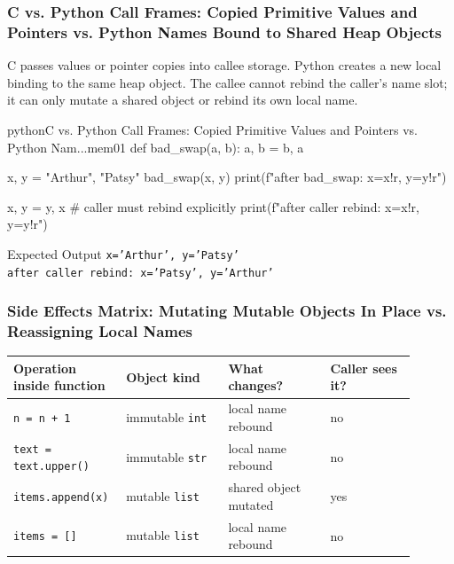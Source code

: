 \documentclass[a4paper,twoside]{report}
\begin{document}
\subsubsection{C vs. Python Call Frames: Copied Primitive Values and Pointers vs. Python Names Bound to Shared Heap Objects}

C passes values or pointer copies into callee storage. Python creates a new local binding to the same heap object. The callee cannot rebind the caller's name slot; it can only mutate a shared object or rebind its own local name.

\begin{codebox}[]{python}{C vs. Python Call Frames: Copied Primitive Values and Pointers vs. Python Nam...}{mem01}
def bad_swap(a, b):
    a, b = b, a

x, y = "Arthur", "Patsy"
bad_swap(x, y)
print(f"after bad_swap: x={x!r}, y={y!r}")

x, y = y, x  # caller must rebind explicitly
print(f"after caller rebind: x={x!r}, y={y!r}")
\end{codebox}


\begin{iobox}{Expected Output}
\texttt{x='Arthur', y='Patsy'} \\
\texttt{after caller rebind: x='Patsy', y='Arthur'} \\
\end{iobox}




\subsubsection{Side Effects Matrix: Mutating Mutable Objects In Place vs. Reassigning Local Names}

\begin{center}
\begin{tabular}{|p{0.22\linewidth}|p{0.24\linewidth}|p{0.24\linewidth}|p{0.20\linewidth}|}
\hline
\textbf{Operation inside function} & \textbf{Object kind} & \textbf{What changes?} & \textbf{Caller sees it?} \\
\hline
\texttt{n = n + 1} & immutable \texttt{int} & local name rebound & no \\
\hline
\texttt{text = text.upper()} & immutable \texttt{str} & local name rebound & no \\
\hline
\texttt{items.append(x)} & mutable \texttt{list} & shared object mutated & yes \\
\hline
\texttt{items = []} & mutable \texttt{list} & local name rebound & no \\
\hline
\end{tabular}
\end{center}
\end{document}
